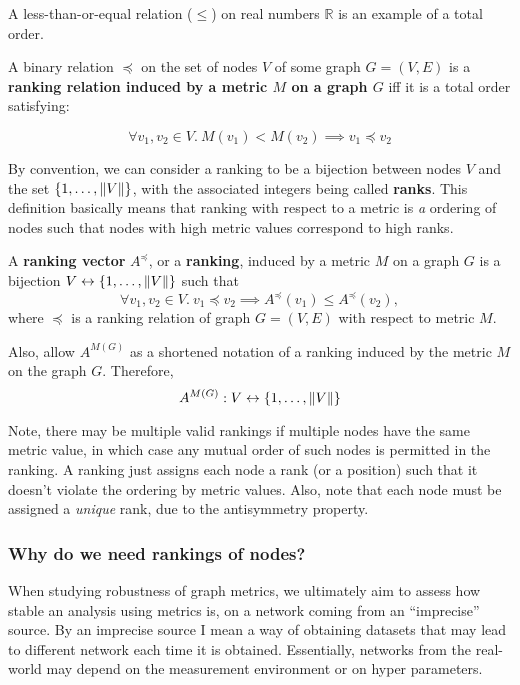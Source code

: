 A less-than-or-equal relation ($\leq$) on real numbers $\mathbb{R}$ is an example of a total order.

\begin{definition}
    A binary relation $\preceq$ on the set of nodes $V$ of some graph $G = (V, E)$ is a \textbf{ranking relation induced by a metric $M$ on a graph $G$} iff it is a total order satisfying:

    \[ \forall v_1, v_2 \in V.\ M(v_1) < M(v_2) \implies v_1 \preceq v_2 \]
\end{definition}

By convention, we can consider a ranking to be a bijection between nodes $V$ and the set $\left\{1, \dots, \left\| V \right\|\right\}$, with the associated integers being called \textbf{ranks}.
This definition basically means that ranking with respect to a metric is \textsl{a} ordering of nodes such that nodes with high metric values correspond to high ranks.

\begin{definition}
    A \textbf{ranking vector} $A^{\preceq}$, or a \textbf{ranking}, induced by a metric $M$ on a graph $G$ is a bijection $V \leftrightarrow \left\{1, \dots, \left\| V \right\|\right\}$ such that
    \[ \forall v_1, v_2 \in V.\ v_1 \preceq v_2 \implies A^{\preceq}(v_1) \leq A^{\preceq}(v_2), \]
    where $\preceq$ is a ranking relation of graph $G = (V, E)$ with respect to metric $M$.

    Also, allow $A^{M(G)}$ as a shortened notation of a ranking induced by the metric $M$ on the graph $G$.
    Therefore,
    \[ A^{M(G)} : V \leftrightarrow \left\{1, \dots, \left\| V \right\|\right\} \]
\end{definition}

Note, there may be multiple valid rankings if multiple nodes have the same metric value, in which case any mutual order of such nodes is permitted in the ranking.
A ranking just assigns each node a rank (or a position) such that it doesn't violate the ordering by metric values.
Also, note that each node must be assigned a \textsl{unique} rank, due to the antisymmetry property.



\subsubsection*{Why do we need rankings of nodes?}

When studying robustness of graph metrics, we ultimately aim to assess how stable an analysis using metrics is, on a network coming from an ``imprecise'' source.
By an imprecise source I mean a way of obtaining datasets that may lead to different network each time it is obtained.
Essentially, networks from the real-world may depend on the measurement environment or on hyper parameters.

